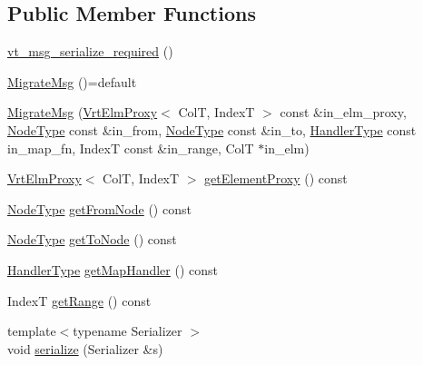 \subsection*{Public Member Functions}
\begin{DoxyCompactItemize}
\item 
\hyperlink{structvt_1_1vrt_1_1collection_1_1_migrate_msg_ad6dcb8f2f1555556800b50195d219c19}{vt\+\_\+msg\+\_\+serialize\+\_\+required} ()
\item 
\hyperlink{structvt_1_1vrt_1_1collection_1_1_migrate_msg_a0b41c5d241e067dadb4648653f9909bc}{Migrate\+Msg} ()=default
\item 
\hyperlink{structvt_1_1vrt_1_1collection_1_1_migrate_msg_a998fcb7e752665042449188788481edb}{Migrate\+Msg} (\hyperlink{structvt_1_1vrt_1_1collection_1_1_vrt_elm_proxy}{Vrt\+Elm\+Proxy}$<$ ColT, IndexT $>$ const \&in\+\_\+elm\+\_\+proxy, \hyperlink{namespacevt_a866da9d0efc19c0a1ce79e9e492f47e2}{Node\+Type} const \&in\+\_\+from, \hyperlink{namespacevt_a866da9d0efc19c0a1ce79e9e492f47e2}{Node\+Type} const \&in\+\_\+to, \hyperlink{namespacevt_af64846b57dfcaf104da3ef6967917573}{Handler\+Type} const in\+\_\+map\+\_\+fn, IndexT const \&in\+\_\+range, ColT $\ast$in\+\_\+elm)
\item 
\hyperlink{structvt_1_1vrt_1_1collection_1_1_vrt_elm_proxy}{Vrt\+Elm\+Proxy}$<$ ColT, IndexT $>$ \hyperlink{structvt_1_1vrt_1_1collection_1_1_migrate_msg_a6a8d4f819ebe556df1f3533bfa0e21f2}{get\+Element\+Proxy} () const
\item 
\hyperlink{namespacevt_a866da9d0efc19c0a1ce79e9e492f47e2}{Node\+Type} \hyperlink{structvt_1_1vrt_1_1collection_1_1_migrate_msg_ab3b156dd31382eab3551024ee3668fad}{get\+From\+Node} () const
\item 
\hyperlink{namespacevt_a866da9d0efc19c0a1ce79e9e492f47e2}{Node\+Type} \hyperlink{structvt_1_1vrt_1_1collection_1_1_migrate_msg_a24d93f9c73876f57d51a83f53a6e6796}{get\+To\+Node} () const
\item 
\hyperlink{namespacevt_af64846b57dfcaf104da3ef6967917573}{Handler\+Type} \hyperlink{structvt_1_1vrt_1_1collection_1_1_migrate_msg_a53385ade125d280d5621f1b5cdbffa78}{get\+Map\+Handler} () const
\item 
IndexT \hyperlink{structvt_1_1vrt_1_1collection_1_1_migrate_msg_a248315e475abddd6d6b0d0213d6c2dab}{get\+Range} () const
\item 
{\footnotesize template$<$typename Serializer $>$ }\\void \hyperlink{structvt_1_1vrt_1_1collection_1_1_migrate_msg_afd275449bca23638c2d8139fff35d39f}{serialize} (Serializer \&s)
\end{DoxyCompactItemize}
